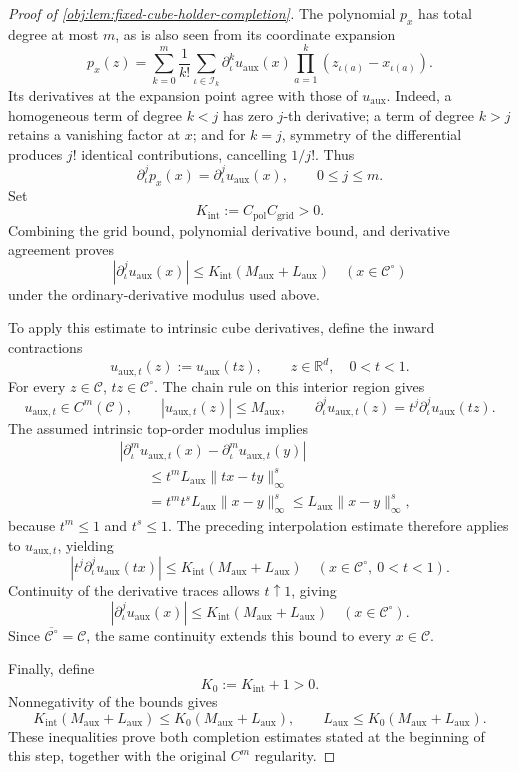 \begin{proof}[Proof of \cref{obj:lem:fixed-cube-holder-completion}]
The polynomial \(p_x\) has total degree at most \(m\), as is also seen from its coordinate expansion
\[
p_x(z)=
\sum_{k=0}^m\frac{1}{k!}
\sum_{\iota\in\mathscr I_k}
\partial_\iota^k u_{\mathrm{aux}}(x)
\prod_{a=1}^k(z_{\iota(a)}-x_{\iota(a)}).
\]
Its derivatives at the expansion point agree with those of \(u_{\mathrm{aux}}\). Indeed, a homogeneous term of degree \(k<j\) has zero \(j\)-th derivative; a term of degree \(k>j\) retains a vanishing factor at \(x\); and for \(k=j\), symmetry of the differential produces \(j!\) identical contributions, cancelling \(1/j!\). Thus
\[
\partial_\iota^j p_x(x)
=
\partial_\iota^j u_{\mathrm{aux}}(x),
\qquad 0\le j\le m.
\]
Set
\[
K_{\mathrm{int}}:=C_{\mathrm{pol}}C_{\mathrm{grid}}>0.
\]
Combining the grid bound, polynomial derivative bound, and derivative agreement proves
\[
|\partial_\iota^j u_{\mathrm{aux}}(x)|
\le K_{\mathrm{int}}(M_{\mathrm{aux}}+L_{\mathrm{aux}})
\quad(x\in\mathscr C^\circ)
\]
under the ordinary-derivative modulus used above.

To apply this estimate to intrinsic cube derivatives, define the inward contractions
\[
u_{\mathrm{aux},t}(z):=u_{\mathrm{aux}}(tz),
\qquad z\in\mathbb R^d,\quad 0<t<1.
\]
For every \(z\in\mathscr C\), \(tz\in\mathscr C^\circ\). The chain rule on this interior region gives
\[
u_{\mathrm{aux},t}\in C^m(\mathscr C),\qquad
|u_{\mathrm{aux},t}(z)|\le M_{\mathrm{aux}},
\qquad
\partial_\iota^j u_{\mathrm{aux},t}(z)
=t^j\partial_\iota^j u_{\mathrm{aux}}(tz).
\]
The assumed intrinsic top-order modulus implies
\[
\begin{aligned}
&|\partial_\iota^m u_{\mathrm{aux},t}(x)
-\partial_\iota^m u_{\mathrm{aux},t}(y)|\\
&\qquad\le
t^mL_{\mathrm{aux}}\|tx-ty\|_\infty^s\\
&\qquad=
t^m t^s L_{\mathrm{aux}}\|x-y\|_\infty^s
\le L_{\mathrm{aux}}\|x-y\|_\infty^s,
\end{aligned}
\]
because \(t^m\le1\) and \(t^s\le1\). The preceding interpolation estimate therefore applies to \(u_{\mathrm{aux},t}\), yielding
\[
|t^j\partial_\iota^j u_{\mathrm{aux}}(tx)|
\le K_{\mathrm{int}}(M_{\mathrm{aux}}+L_{\mathrm{aux}})
\quad(x\in\mathscr C^\circ,\ 0<t<1).
\]
Continuity of the derivative traces allows \(t\uparrow1\), giving
\[
|\partial_\iota^j u_{\mathrm{aux}}(x)|
\le K_{\mathrm{int}}(M_{\mathrm{aux}}+L_{\mathrm{aux}})
\quad(x\in\mathscr C^\circ).
\]
Since \(\overline{\mathscr C^\circ}=\mathscr C\), the same continuity extends this bound to every \(x\in\mathscr C\).

Finally, define
\[
K_0:=K_{\mathrm{int}}+1>0.
\]
Nonnegativity of the bounds gives
\[
K_{\mathrm{int}}(M_{\mathrm{aux}}+L_{\mathrm{aux}})
\le K_0(M_{\mathrm{aux}}+L_{\mathrm{aux}}),
\qquad
L_{\mathrm{aux}}
\le K_0(M_{\mathrm{aux}}+L_{\mathrm{aux}}).
\]
These inequalities prove both completion estimates stated at the beginning of this step, together with the original \(C^m\) regularity.


\end{proof}
